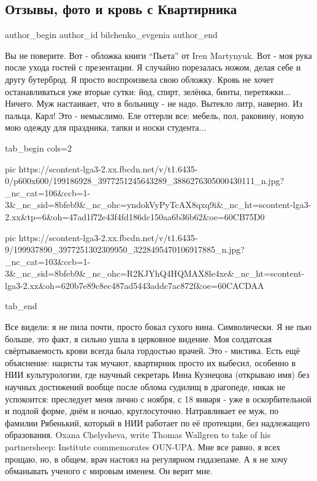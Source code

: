  
 
 
 
 
 
\subsection{Отзывы, фото и кровь с Квартирника}
\label{sec:13_06_2021.fb.bilchenko_evgenia.2.krovj_kvartirnik_otzyvy_foto}
\ifcmt
 author_begin
   author_id bilchenko_evgenia
 author_end
\fi

Вы не поверите. Вот - обложка книги \enquote{Пьета} от Iren Martynyuk. Вот -
моя рука после ухода гостей с презентации. Я случайно порезалась ножом, делая
себе и другу бутерброд. Я просто воспроизвела свою обложку. Кровь не хочет
останавливаться уже вторые сутки: йод, спирт, зелёнка, бинты, перетяжки...
Ничего. Муж настаивает, что в больницу - не надо. Вытекло литр, наверно. Из
пальца, Карл! Это - немыслимо. Еле оттерли все: мебель, пол, раковину, новую
мою одежду для праздника, тапки и носки студента... 


\ifcmt
  tab_begin cols=2

     pic https://scontent-lga3-2.xx.fbcdn.net/v/t1.6435-0/p600x600/199186928_3977251245643289_3886276305000430111_n.jpg?_nc_cat=106&ccb=1-3&_nc_sid=8bfeb9&_nc_ohc=yndokVyPyTcAX8qxq9i&_nc_ht=scontent-lga3-2.xx&tp=6&oh=47ad1f72e43f4fd186dc150aa6b36b62&oe=60CB75D0

     pic https://scontent-lga3-2.xx.fbcdn.net/v/t1.6435-9/199937890_3977251302309950_3228495470106917885_n.jpg?_nc_cat=103&ccb=1-3&_nc_sid=8bfeb9&_nc_ohc=R2KJYhQ4HQMAX8le4xe&_nc_ht=scontent-lga3-2.xx&oh=620b7e89c8ec487ad5443addc7ac872f&oe=60CACDAA

  tab_end
\fi

Все видели: я не пила почти, просто бокал сухого вина. Символически. Я не пью
больше, это факт, я сильно ушла в церковное видение. Моя солдатская
свёртываемость крови всегда была гордостью врачей. Это - мистика. Есть ещё
объяснение: нацисты так мучают, квартирник просто их выбесил, особенно в НИИ
культурологии, где научный секретарь Инна Кузнецова (открываю имя) без научных
достижений вообще после облома судилищ в драгопеде, никак не успокоится:
преследует меня лично с ноября, с 18 января - уже в оскорбительной и подлой
форме, днём и ночью, круглосуточно. Натравливает ее муж, по фамилии Рябенький,
который в НИИ работает по её протекции, без надлежащего образования. Oxana
Chelysheva, write Thomas Wallgren to take of his partnersheep: Institute
commemorates OUN-UPA. Мне все равно, я всех прощаю, но, в общем, врач настоял
на регулярном гидазепаме. А я не хочу обманывать ученого с мировым именем. Он
верит мне. 

